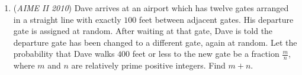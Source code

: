 \begin{enumerate}
 
            \begin{itemize}
        \item Numbers that are divisible by $2$ at least three times: $8,16$
            \end{itemize}
            
            \begin{enumerate}[label=(\roman*)]
                \item Exponent corresponding to each one of them $12, 4$
            \end{enumerate}
            
            \begin{enumerate}[label=(\roman*)]
                \item Sum $=12+4=16$
            \end{enumerate}
            


 
            \begin{itemize}
        \item Number that are divisible by $2$ at least four times: $16$
            \end{itemize}
            
            \begin{enumerate}[label=(\roman*)]
                \item Exponent corresponding to each one of them $4$
            \end{enumerate}
            
            \begin{enumerate}[label=(\roman*)]
                \item Sum $=4$
            \end{enumerate}
            


 Summing these give an answer of $\boxed{150}$.

 


	\item (\textit{AIME II 2010}) Dave arrives at an airport which has twelve gates arranged in a straight line with exactly $100$ feet between adjacent gates. His departure gate is assigned at random. After waiting at that gate, Dave is told the departure gate has been changed to a different gate, again at random. Let the probability that Dave walks $400$ feet or less to the new gate be a fraction $\frac{m}{n}$, where $m$ and $n$ are relatively prime positive integers. Find $m+n$.



\end{enumerate}
